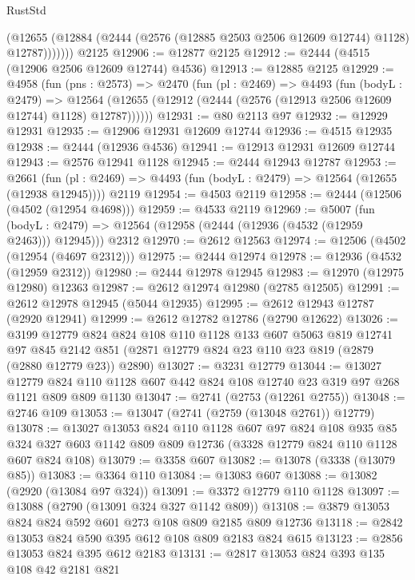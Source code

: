 \begin{lexlean}{RustStd}
\begin{coremodule}
            (@12655 (@12884 (@2444 (@2576 (@12885 @2503 @2506 @12609 @12744) @1128) @12787)))))))
    @2125
@12906 := @12877 @2125
@12912 := @2444 (@4515 (@12906 @2506 @12609 @12744) @4536)
@12913 := @12885 @2125
@12929 := @4958
    (fun (pns : @2573) =>
    @2470
      (fun (pl : @2469) =>
      @4493
        (fun (bodyL : @2479) =>
        @12564 (@12655 (@12912 (@2444 (@2576 (@12913 @2506 @12609 @12744) @1128) @12787))))))
@12931 := @80 @2113 @97
@12932 := @12929 @12931
@12935 := @12906 @12931 @12609 @12744
@12936 := @4515 @12935
@12938 := @2444 (@12936 @4536)
@12941 := @12913 @12931 @12609 @12744
@12943 := @2576 @12941 @1128
@12945 := @2444 @12943 @12787
@12953 := @2661
    (fun (pl : @2469) => @4493 (fun (bodyL : @2479) => @12564 (@12655 (@12938 @12945))))
    @2119
@12954 := @4503 @2119
@12958 := @2444 (@12506 (@4502 (@12954 @4698)))
@12959 := @4533 @2119
@12969 := @5007
    (fun (bodyL : @2479) => @12564 (@12958 (@2444 (@12936 (@4532 (@12959 @2463))) @12945)))
    @2312
@12970 := @2612 @12563
@12974 := @12506 (@4502 (@12954 (@4697 @2312)))
@12975 := @2444 @12974
@12978 := @12936 (@4532 (@12959 @2312))
@12980 := @2444 @12978 @12945
@12983 := @12970 (@12975 @12980) @12363
@12987 := @2612 @12974 @12980 (@2785 @12505)
@12991 := @2612 @12978 @12945 (@5044 @12935)
@12995 := @2612 @12943 @12787 (@2920 @12941)
@12999 := @2612 @12782 @12786 (@2790 @12622)
@13026 := @3199
    @12779
    @824
    @824
    @108
    @110
    @1128
    @133
    @607
    @5063
    @819
    @12741
    @97
    @845
    @2142
    @851
    (@2871 @12779 @824 @23 @110 @23 @819 (@2879 (@2880 @12779 @23)) @2890)
@13027 := @3231 @12779
@13044 := @13027
    @12779
    @824
    @110
    @1128
    @607
    @442
    @824
    @108
    @12740
    @23
    @319
    @97
    @268
    @1121
    @809
    @809
    @1130
@13047 := @2741 (@2753 (@12261 @2755))
@13048 := @2746 @109
@13053 := @13047 (@2741 (@2759 (@13048 @2761)) @12779)
@13078 := @13027
    @13053
    @824
    @110
    @1128
    @607
    @97
    @824
    @108
    @935
    @85
    @324
    @327
    @603
    @1142
    @809
    @809
    @12736
    (@3328 @12779 @824 @110 @1128 @607 @824 @108)
@13079 := @3358 @607
@13082 := @13078 (@3338 (@13079 @85))
@13083 := @3364 @110
@13084 := @13083 @607
@13088 := @13082 (@2920 (@13084 @97 @324))
@13091 := @3372 @12779 @110 @1128
@13097 := @13088 (@2790 (@13091 @324 @327 @1142 @809))
@13108 := @3879 @13053 @824 @824 @592 @601 @273 @108 @809 @2185 @809 @12736
@13118 := @2842 @13053 @824 @590 @395 @612 @108 @809 @2183 @824 @615
@13123 := @2856 @13053 @824 @395 @612 @2183
@13131 := @2817 @13053 @824 @393 @135 @108 @42 @2181 @821

\end{coremodule}
\end{lexlean}
